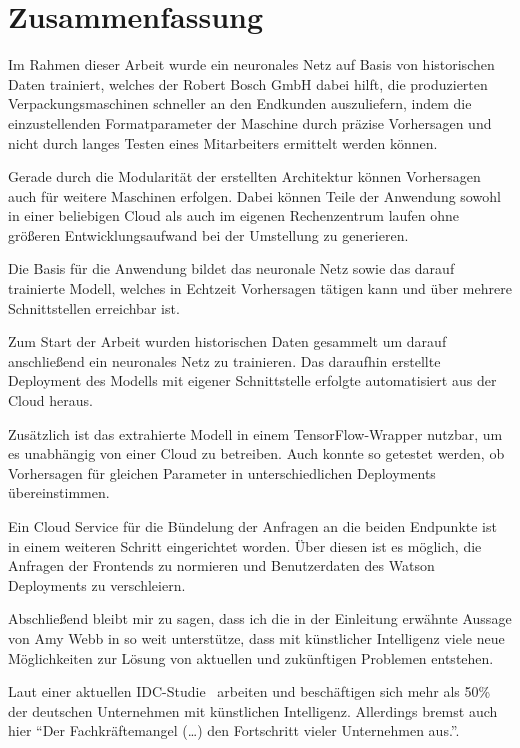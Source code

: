 \chapter{Zusammenfassung}
\label{ch:zusammenfassung}
Im Rahmen dieser Arbeit wurde ein neuronales Netz auf Basis von historischen Daten trainiert, welches der Robert Bosch
GmbH dabei hilft, die produzierten Verpackungsmaschinen schneller an den Endkunden auszuliefern, indem die
einzustellenden Formatparameter der Maschine durch präzise Vorhersagen und nicht durch langes Testen eines Mitarbeiters
ermittelt werden können.

Gerade durch die Modularität der erstellten Architektur können Vorhersagen auch für weitere Maschinen erfolgen. Dabei
können Teile der Anwendung sowohl in einer beliebigen Cloud als auch im eigenen Rechenzentrum laufen ohne größeren
Entwicklungsaufwand bei der Umstellung zu generieren.

Die Basis für die Anwendung bildet das neuronale Netz sowie das darauf trainierte Modell, welches in Echtzeit
Vorhersagen tätigen kann und über mehrere Schnittstellen erreichbar ist.

Zum Start der Arbeit wurden historischen Daten gesammelt um darauf anschließend ein neuronales Netz zu trainieren. Das
daraufhin erstellte Deployment des Modells mit eigener Schnittstelle erfolgte automatisiert aus der Cloud heraus.

Zusätzlich ist das extrahierte Modell in einem TensorFlow-Wrapper nutzbar, um es unabhängig von einer Cloud zu
betreiben. Auch konnte so getestet werden, ob Vorhersagen für gleichen Parameter in unterschiedlichen Deployments
übereinstimmen.

Ein Cloud Service für die Bündelung der Anfragen an die beiden Endpunkte ist in einem weiteren Schritt eingerichtet
worden. Über diesen ist es möglich, die Anfragen der Frontends zu normieren und Benutzerdaten des Watson Deployments zu
verschleiern.

Abschließend bleibt mir zu sagen, dass ich die in der Einleitung erwähnte Aussage von Amy Webb in so weit unterstütze,
dass mit künstlicher Intelligenz viele neue Möglichkeiten zur Lösung von aktuellen und zukünftigen Problemen entstehen.

Laut einer aktuellen IDC-Studie~\cite{article_zusammenfassung_idc} arbeiten und beschäftigen sich mehr als 50\% der
deutschen Unternehmen mit künstlichen Intelligenz. Allerdings bremst auch hier \enquote{Der Fachkräftemangel (\ldots)
den Fortschritt vieler Unternehmen aus.}.